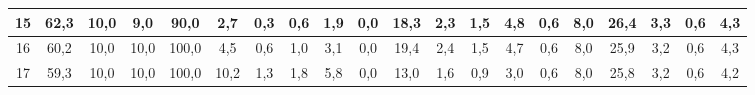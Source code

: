 \begin{sidewaystable}[]
\begin{tabular}{|c|c|c|c|c|c|c|c|c|c|c|c|c|c|c|c|c|c|c|c|}
    15 & 62,3                                            & 10,0                                            & 9,0                                             & 90,0                                            & 2,7                                             & 0,3                                             & 0,6                                             & 1,9                                             & 0,0                                             & 18,3                                             & 2,3                                              & 1,5                                              & 4,8                                              & 0,6                                              & 8,0                                              & 26,4                                             & 3,3                                              & 0,6                                              & 4,3                                              \\ \hline
    16 & 60,2                                            & 10,0                                            & 10,0                                            & 100,0                                           & 4,5                                             & 0,6                                             & 1,0                                             & 3,1                                             & 0,0                                             & 19,4                                             & 2,4                                              & 1,5                                              & 4,7                                              & 0,6                                              & 8,0                                              & 25,9                                             & 3,2                                              & 0,6                                              & 4,3                                              \\ \hline
    17 & 59,3                                            & 10,0                                            & 10,0                                            & 100,0                                           & 10,2                                            & 1,3                                             & 1,8                                             & 5,8                                             & 0,0                                             & 13,0                                             & 1,6                                              & 0,9                                              & 3,0                                              & 0,6                                              & 8,0                                              & 25,8                                             & 3,2                                              & 0,6                                              & 4,2                                              \\ \hline

\end{tabular}
\end{sidewaystable}
